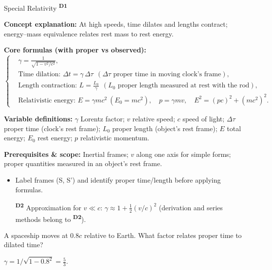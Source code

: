 ﻿\documentclass[12pt,a4paper]{article}
\providecommand{\KPFormulas}{}
\providecommand{\KPHeuristics}{}
\providecommand{\KPProblems}{}
\newcommand{\DOne}{\texorpdfstring{\textsuperscript{\textbf{D1}}}{ D1}}
\newcommand{\DTwo}{\texorpdfstring{\textsuperscript{\textbf{D2}}}{ D2}}
\begin{document}
\begin{KnowledgePoint}{Special Relativity \DOne}
  \KPFormulas
  \begin{formulabox}
  \textbf{Concept explanation:} At high speeds, time dilates and lengths contract; energy–mass equivalence relates rest mass to rest energy.

  \textbf{Core formulas (with proper vs observed):}
  \[
  \left\{\begin{aligned}
  &\gamma=\frac{1}{\sqrt{1-v^2/c^2}},\\
  &\text{Time dilation: } \Delta t=\gamma\,\Delta \tau\ \ (\Delta \tau\text{ proper time in moving clock's frame}),\\
  &\text{Length contraction: } L=\frac{L_0}{\gamma}\ \ (L_0\text{ proper length measured at rest with the rod}),\\
  &\text{Relativistic energy: } E=\gamma mc^2\ (E_0=mc^2),\quad p=\gamma mv,\quad E^2=(pc)^2+(mc^2)^2.
  \end{aligned}\right.
  \]

\textbf{Variable definitions:} $\gamma$ Lorentz factor; $v$ relative speed; $c$ speed of light; $\Delta \tau$ proper time (clock's rest frame); $L_0$ proper length (object's rest frame); $E$ total energy; $E_0$ rest energy; $p$ relativistic momentum.

  \textbf{Prerequisites \& scope:} Inertial frames; $v$ along one axis for simple forms; proper quantities measured in an object's rest frame.
  \end{formulabox}

  \KPHeuristics
\begin{heuristicsbox}
  \begin{itemize}[leftmargin=*]
    \item Label frames (S, S') and identify proper time/length before applying formulas.
    \item [\DTwo] Approximation for $v\ll c$: $\gamma\approx1+\tfrac12(v/c)^2$ (derivation and series methods belong to \DTwo).
  \end{itemize}
  \end{heuristicsbox}

  \KPProblems
  \begin{cheatproblem}
  A spaceship moves at $0.8c$ relative to Earth. What factor relates proper time to dilated time?
  \begin{solutionbox}
  $\gamma=1/\sqrt{1-0.8^2}=\tfrac{5}{3}$.
  \end{solutionbox}
  \end{cheatproblem}
\end{KnowledgePoint}
\end{document}
